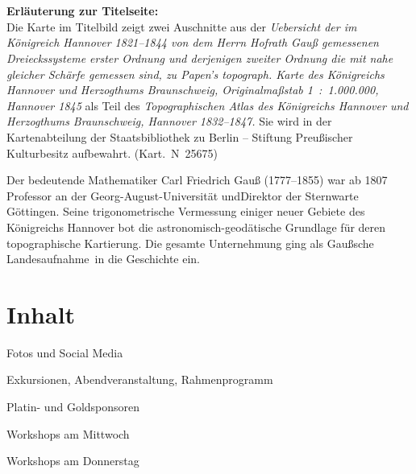 \section*{}
\vfill

{\bfseries Erläuterung zur Titelseite:}\\
Die Karte im Titelbild zeigt zwei Auschnitte aus der \textit{Uebersicht der im Königreich Hannover 1821–1844 von dem Herrn Hofrath Gauß gemessenen Dreieckssysteme erster Ordnung und derjenigen zweiter Ordnung die mit nahe gleicher Schärfe gemessen sind, zu Papen's topograph. Karte des Königreichs Hannover und Herzogthums Braunschweig, Originalmaßstab 1~:~1.000.000, Hannover 1845} als Teil des \textit{Topographischen Atlas des Königreichs Hannover und Herzogthums Braunschweig, Hannover 1832–1847.} Sie wird in der Kartenabteilung der Staatsbibliothek zu Berlin – Stiftung Preußischer Kulturbesitz aufbewahrt. (Kart.~N~25675)

Der bedeutende Mathematiker Carl Friedrich Gauß (1777–1855) war ab 1807 Professor an der Georg-August-Uni\-ver\-si\-tät und\linebreak Direktor der Sternwarte Göttingen. Seine trigonometrische Vermessung einiger neuer Gebiete des Königreichs Hannover bot die astronomisch-geodätische Grundlage für deren topographische Kartierung. Die gesamte Unternehmung ging als \glqq Gaußsche Landesaufnahme\grqq\  in die Geschichte ein.
\newpage
{}
\section*{Inhalt}
\label{contents}
\newlength\contentspace
\setlength\contentspace{0.2em}

\vspace*{\contentspace}%
\noindent Fotos und Social Media \dotfill \pageref{Fotos und Social Media}

\vspace*{\contentspace}%
\noindent Exkursionen, Abendveranstaltung, Rahmenprogramm  \dotfill \pageref{exkursionen}

\vspace*{\contentspace}%
\noindent Platin- und Goldsponsoren \dotfill \pageref{platinsposoren}

\vspace*{\contentspace}%
\noindent Workshops am Mittwoch \dotfill \pageref{mittwoch-workshops}

\vspace*{\contentspace}%
\noindent Workshops am Donnerstag \dotfill \pageref{donnerstag-workshops}

